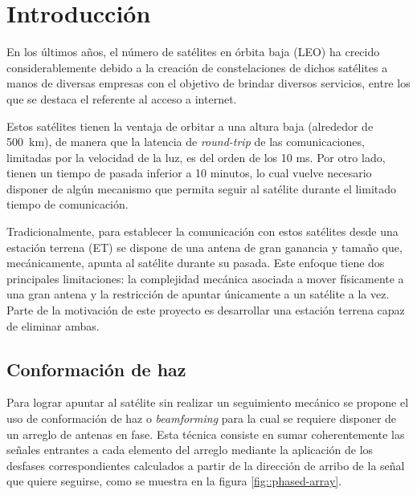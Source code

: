 \documentclass[../../main.tex]{subfiles}
\begin{document}
\graphicspath{{./figures}}
\chapter{Introducción}


En los últimos años, el número de satélites en órbita baja (LEO) ha crecido considerablemente debido a la creación de constelaciones de dichos satélites a manos de diversas empresas \cite{LeoConstellation} con el objetivo de brindar diversos servicios, entre los que se destaca el referente al acceso a internet. 

Estos satélites tienen la ventaja de orbitar a una altura baja (alrededor de 500~km), de manera que la latencia de \textit{round-trip} de las comunicaciones, limitadas por la velocidad de la luz, es del orden de los 10 ms. 
Por otro lado, tienen un tiempo de pasada inferior a 10 minutos, lo cual vuelve necesario disponer de algún mecanismo que permita seguir al satélite durante el limitado tiempo de comunicación.

Tradicionalmente, para establecer la comunicación con estos satélites desde una estación terrena (ET) se dispone de una antena de gran ganancia y tamaño que, mecánicamente, apunta al satélite durante su pasada.
Este enfoque tiene dos principales limitaciones: la complejidad mecánica asociada a mover físicamente a una gran antena y la restricción de apuntar únicamente a un satélite a la vez. Parte de la motivación de este proyecto es desarrollar una estación terrena capaz de eliminar ambas.


\section{Conformación de haz}

Para lograr apuntar al satélite sin realizar un seguimiento mecánico se propone el uso de conformación de haz o \textit{beamforming} para la cual se requiere disponer de un arreglo de antenas en fase. Esta técnica consiste en sumar coherentemente las señales entrantes a cada elemento del arreglo mediante la aplicación de los desfases correspondientes calculados a partir de la dirección de arribo de la señal que quiere seguirse, como se muestra en la figura \ref{fig::phased-array}.
\end{document}
